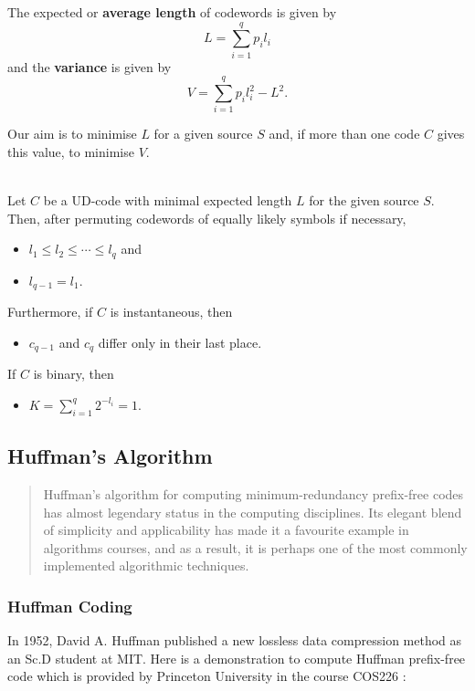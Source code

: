 \documentclass{article}
\begin{document}
The expected or \textbf{average length} of codewords is given by
    \[L=\sum_{i=1}^{q}p_{i}l_{i}\]
    and the \textbf{variance} is given by
    \[V=\sum_{i=1}^{q}p_{i}l_{i}^{2}-L^{2}.\]

Our aim is to minimise $L$ for a given source $S$ and, if more than one code $C$ gives this value, to minimise $V$.

\begin{theorem}
    \mbox{}\\
    Let $C$ be a UD-code with minimal expected length $L$ for the given source $S$. Then, after permuting codewords of equally likely symbols if necessary,
    \begin{itemize}
        \item $l_{1} \leq l_{2} \leq \cdots \leq l_{q}$ and
        \item $l_{q-1}=l_{1}$.
    \end{itemize}
    Furthermore, if $C$ is instantaneous, then
    \begin{itemize}
        \item $c_{q-1}$ and $c_{q}$ differ only in their last place.
    \end{itemize}
    If $C$ is binary, then
    \begin{itemize}
        \item $K=\sum_{i=1}^{q}2^{-l_{i}}=1.$
    \end{itemize}
\end{theorem}

\subsection{Huffman's Algorithm}

\begin{quotation}
    Huffman’s algorithm for computing minimum-redundancy prefix-free codes has almost legendary status in the computing disciplines. Its elegant blend of simplicity and applicability has made it a favourite example in algorithms courses, and as a result, it is perhaps one of the most commonly implemented algorithmic techniques. \cite{Moffat_2019}
\end{quotation}

\subsubsection{Huffman Coding}

In 1952, David A. Huffman \cite{Huffman_1952} published a new lossless data compression method as an Sc.D student at MIT. Here is a demonstration to compute Huffman prefix-free code which is provided by Princeton University in the course COS226 \cite{princetonLec5.5}:
\end{document}
